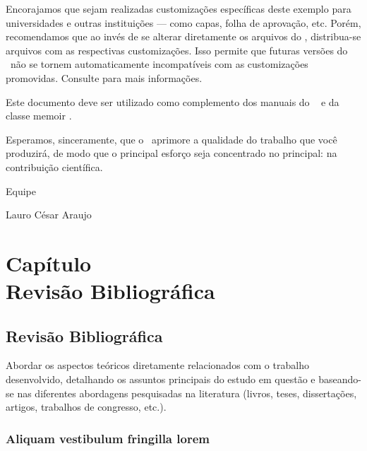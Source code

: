 \documentclass[
	12pt,			%
	openany,			%
	oneside,			%
	a4paper,			%
	english,			%
	french,				%
	spanish,			%
	brazil				%
	]{abntex2}
\begin{document}
Encorajamos que sejam realizadas customizações específicas deste exemplo para
universidades e outras instituições --- como capas, folha de aprovação, etc.
Porém, recomendamos que ao invés de se alterar diretamente os arquivos do
\abnTeX, distribua-se arquivos com as respectivas customizações.
Isso permite que futuras versões do \abnTeX~não se tornem automaticamente
incompatíveis com as customizações promovidas. Consulte
 para mais informações.

Este documento deve ser utilizado como complemento dos manuais do \abnTeX\ 
\cite{abntex2classe,abntex2cite,abntex2cite-alf} e da classe \textsf{memoir}
\cite{memoir}. 

Esperamos, sinceramente, que o \abnTeX\ aprimore a qualidade do trabalho que
você produzirá, de modo que o principal esforço seja concentrado no principal:
na contribuição científica.

Equipe \abnTeX 

Lauro César Araujo


\part*{Capítulo \thechapter \\ Revisão Bibliográfica}
\addtocounter{chapter}{-1}

\chapter{ Revisão Bibliográfica}
Abordar os aspectos teóricos diretamente relacionados com o trabalho desenvolvido,
detalhando os assuntos principais do estudo em questão e baseando-se nas diferentes
abordagens pesquisadas na literatura (livros, teses, dissertações, artigos, trabalhos de
congresso, etc.).
\section{Aliquam vestibulum fringilla lorem}

\lipsum[1]

\end{document}
